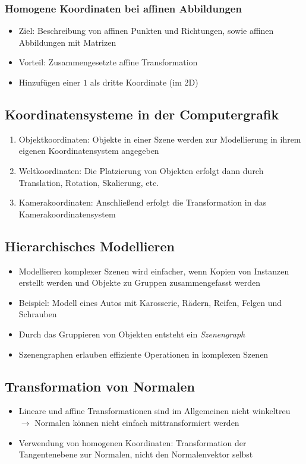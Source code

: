 \subsubsection{Homogene Koordinaten bei affinen Abbildungen}
\begin{itemize}
	\item Ziel: Beschreibung von affinen Punkten und Richtungen, sowie affinen Abbildungen mit Matrizen
	\item Vorteil: Zusammengesetzte affine Transformation
	\item Hinzufügen einer \(1\) als dritte Koordinate (im 2D)
\end{itemize}


\subsection{Koordinatensysteme in der Computergrafik}
\begin{enumerate}
	\item Objektkoordinaten: Objekte in einer Szene werden zur Modellierung in ihrem eigenen Koordinatensystem angegeben
	\item Weltkoordinaten: Die Platzierung von Objekten erfolgt dann durch Translation, Rotation, Skalierung, etc.
	\item Kamerakoordinaten: Anschließend erfolgt die Transformation in das Kamerakoordinatensystem
\end{enumerate}


\subsection{Hierarchisches Modellieren}
\begin{itemize}
	\item Modellieren komplexer Szenen wird einfacher, wenn Kopien von Instanzen erstellt werden und Objekte zu Gruppen zusammengefasst werden
	\item Beispiel: Modell eines Autos mit Karosserie, Rädern, Reifen, Felgen und Schrauben
	\item Durch das Gruppieren von Objekten entsteht ein \textit{Szenengraph}
	\item Szenengraphen erlauben effiziente Operationen in komplexen Szenen
\end{itemize}


\subsection{Transformation von Normalen}
\begin{itemize}
	\item Lineare und affine Transformationen sind im Allgemeinen nicht winkeltreu \(\rightarrow\) Normalen können nicht einfach mittransformiert werden
	\item Verwendung von homogenen Koordinaten: Transformation der Tangentenebene zur Normalen, nicht den Normalenvektor selbst
\end{itemize}



